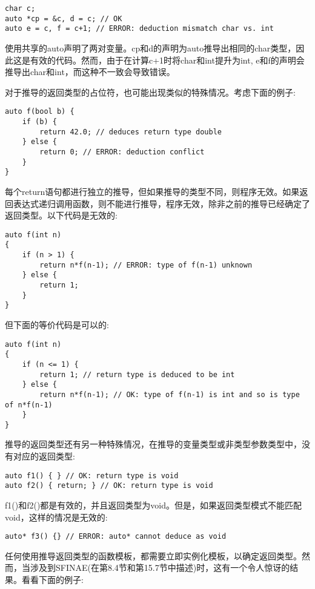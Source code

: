 \begin{lstlisting}[style=styleCXX]
char c;
auto *cp = &c, d = c; // OK
auto e = c, f = c+1; // ERROR: deduction mismatch char vs. int
\end{lstlisting}

使用共享的auto声明了两对变量。cp和d的声明为auto推导出相同的char类型，因此这是有效的代码。然而，由于在计算c+1时将char和int提升为int, e和f的声明会推导出char和int，而这种不一致会导致错误。

对于推导的返回类型的占位符，也可能出现类似的特殊情况。考虑下面的例子:

\begin{lstlisting}[style=styleCXX]
auto f(bool b) {
	if (b) {
		return 42.0; // deduces return type double
	} else {
		return 0; // ERROR: deduction conflict
	}
}
\end{lstlisting}

每个return语句都进行独立的推导，但如果推导的类型不同，则程序无效。如果返回表达式递归调用函数，则不能进行推导，程序无效，除非之前的推导已经确定了返回类型。以下代码是无效的:

\begin{lstlisting}[style=styleCXX]
auto f(int n)
{
	if (n > 1) {
		return n*f(n-1); // ERROR: type of f(n-1) unknown
	} else {
		return 1;
	}
}
\end{lstlisting}

但下面的等价代码是可以的:

\begin{lstlisting}[style=styleCXX]
auto f(int n)
{
	if (n <= 1) {
		return 1; // return type is deduced to be int
	} else {
		return n*f(n-1); // OK: type of f(n-1) is int and so is type of n*f(n-1)
	}
}
\end{lstlisting}

推导的返回类型还有另一种特殊情况，在推导的变量类型或非类型参数类型中，没有对应的返回类型:

\begin{lstlisting}[style=styleCXX]
auto f1() { } // OK: return type is void
auto f2() { return; } // OK: return type is void
\end{lstlisting}

f1()和f2()都是有效的，并且返回类型为void。但是，如果返回类型模式不能匹配void，这样的情况是无效的:

\begin{lstlisting}[style=styleCXX]
auto* f3() {} // ERROR: auto* cannot deduce as void
\end{lstlisting}

任何使用推导返回类型的函数模板，都需要立即实例化模板，以确定返回类型。然而，当涉及到SFINAE(在第8.4节和第15.7节中描述)时，这有一个令人惊讶的结果。看看下面的例子:

